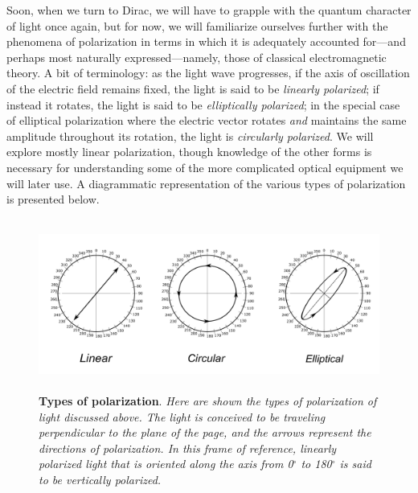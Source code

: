 Soon, when we turn to Dirac, we will have to grapple with the quantum character of light once again, but for now, we
will familiarize ourselves further with the phenomena of polarization in terms in which it is adequately accounted 
for---and perhaps most naturally expressed---namely, those of classical electromagnetic theory. A bit of terminology: as the light wave progresses, if the axis of oscillation of the electric field remains fixed, the light is said to be \emph{linearly polarized}; if instead it rotates, the light is said to be \emph{elliptically polarized}; in the special case of elliptical polarization where the electric vector rotates \emph{and} maintains the same amplitude through\-out its rotation, the light is \emph{circularly polarized}. We will explore mostly linear polarization, though knowledge of the other forms is necessary for understanding some of the more com\-pli\-cat\-ed optical equipment we will later use. A diagrammatic representation of the various types of polarization is presented below.

\begin{figure}[h]
  \begin{center}
  \captionsetup{width=5.5in}
  \includegraphics[width=5.37125in,height=2.215in]{images/11_polarization/linear-circular-elliptical.png}
  \caption*{\textbf{Types of polarization}. \emph{Here are shown the types of polarization of light discussed above. 
  The light is conceived to be traveling perpendicular to the plane of the page, and the arrows represent the directions
  of polarization. In this frame of reference, linearly polarized light that is oriented along the axis from 0$^{\circ}$ to 180$^{\circ}$ is said
  to be vertically polarized.}}
  \end{center}
\vspace*{-20pt}
\end{figure}

